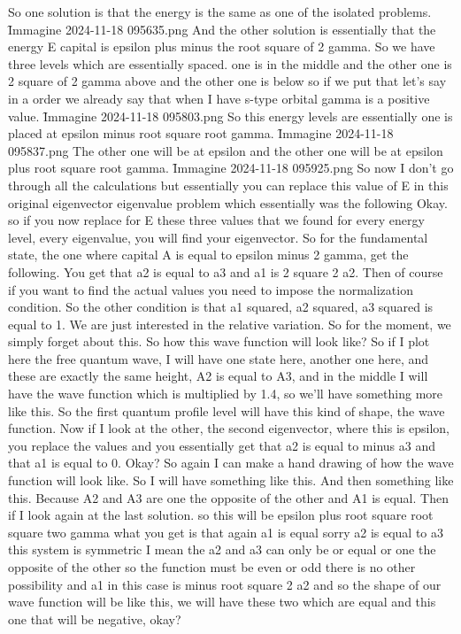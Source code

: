 So one solution is that the energy is the same as one of the isolated problems.
\f{Immagine 2024-11-18 095635.png}
And the other solution is essentially that the energy E capital is epsilon plus minus the root square of 2 gamma. So we have three levels which are essentially spaced. one is in the middle and the other one is 2 square of 2 gamma above and the other one is below so if we put that let's say in a order we already say that when I have s-type orbital gamma is a positive value.
\f{Immagine 2024-11-18 095803.png}
So this energy levels are essentially one is placed at epsilon minus root square root gamma.
\f{Immagine 2024-11-18 095837.png}
The other one will be at epsilon and the other one will be at epsilon plus root square root gamma.
\f{Immagine 2024-11-18 095925.png}
So now I don't go through all the calculations but essentially you can replace this value of E in this original eigenvector eigenvalue problem which essentially was the following Okay. so if you now replace for E these three values that we found for every energy level, every eigenvalue, you will find your eigenvector. So for the fundamental state, the one where capital A is equal to epsilon minus 2 gamma, get the following. You get that a2 is equal to a3 and a1 is 2 square 2 a2. Then of course if you want to find the actual values you need to impose the normalization condition. So the other condition is that a1 squared, a2 squared, a3 squared is equal to 1. We are just interested in the relative variation. So for the moment, we simply forget about this. So how this wave function will look like? So if I plot here the free quantum wave, I will have one state here, another one here, and these are exactly the same height, A2 is equal to A3, and in the middle I will have the wave function which is multiplied by 1.4, so we'll have something more like this. So the first quantum profile level will have this kind of shape, the wave function. Now if I look at the other, the second eigenvector, where this is epsilon, you replace the values and you essentially get that a2 is equal to minus a3 and that a1 is equal to 0. Okay? So again I can make a hand drawing of how the wave function will look like. So I will have something like this. And then something like this. Because A2 and A3 are one the opposite of the other and A1 is equal. Then if I look again at the last solution. so this will be epsilon plus root square root square two gamma what you get is that again a1 is equal sorry a2 is equal to a3 this system is symmetric I mean the a2 and a3 can only be or equal or one the opposite of the other so the function must be even or odd there is no other possibility and a1 in this case is minus root square 2 a2 and so the shape of our wave function will be like this, we will have these two which are equal and this one that will be negative, okay?
